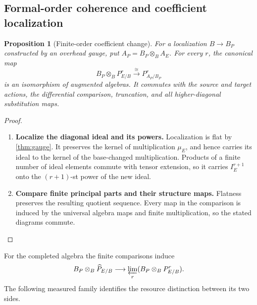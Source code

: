 \documentclass[11pt,a4paper]{article}
\numberwithin{algorithm}{section}
\numberwithin{equation}{section}
\newtheorem{proposition}[proposition]{Proposition}
\theoremstyle{definition}
\theoremstyle{remark}
\theoremstyle{plain}
\theoremstyle{definition}
\theoremstyle{plain}
\begin{document}
\subsection{Formal-order coherence and coefficient localization}
\label{sec:formal-coherence}
\begin{proposition}[Finite-order coefficient change]
\label{prop:formal-base-change}
For a localization $B\to B_P$ constructed by an overhead gauge,
put $A_P=B_P\otimes_BA_E$.  For every $r$, the canonical map
\[
 B_P\otimes_BP^r_{E/B}
 \xrightarrow{\ \cong\ }P^r_{A_P/B_P}
\]
is an isomorphism of augmented algebras.  It commutes with the
source and target actions, the differential comparison, truncation,
and all higher-diagonal substitution maps.
\end{proposition}
\begin{proof}\leavevmode
\begin{enumerate}[leftmargin=*,align=left]
\item \textbf{Localize the diagonal ideal and its powers.}
Localization is flat by \cref{thm:gauge}.  It preserves the
kernel of multiplication $\mu_E$, and hence carries its ideal to
the kernel of the base-changed multiplication.  Products of a
finite number of ideal elements commute with tensor extension, so
it carries $I_E^{r+1}$ onto the $(r+1)$-st power of the new ideal.

\item \textbf{Compare finite principal parts and their structure maps.}
Flatness preserves the resulting quotient sequence.  Every map in
the comparison is induced by the universal algebra maps and finite
multiplication, so the stated diagrams commute.
\end{enumerate}
\end{proof}

For the completed algebra the finite comparisons induce
\begin{equation}\label{eq:formal-gauge-comparison}
 B_P\otimes_B\widehat P_{E/B}\longrightarrow
 \varprojlim_r(B_P\otimes_BP^r_{E/B}).
\end{equation}
The following measured family identifies the resource distinction
between its two sides.
\end{document}
